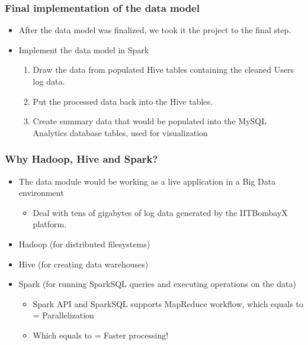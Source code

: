\documentclass[12pt,xcolor=dvipsnames]{beamer}
\begin{document}
\begin{frame}[t]
\frametitle{Final implementation of the data model}

\vfill
\begin{itemize}

\item After the data model was finalized, we took it the project to the final step.

\item Implement the data model in Spark

\begin{enumerate}

\item Draw the data from populated Hive tables containing the cleaned Users log data.

\item Put the processed data back into the Hive tables.

\item Create summary data that would be populated into the MySQL Analytics database tables, used for visualization

\end{enumerate}

\end{itemize}

\end{frame}



\begin{frame}[t]
\frametitle{Why Hadoop, Hive and Spark?}

\vfill
\begin{itemize}

\item The data module would be working as a live application in a Big Data environment

\begin{itemize}
\item Deal with tens of gigabytes of log data generated by the IITBombayX platform.
\end{itemize}

\item Hadoop (for distributed filesystems)

\item Hive (for creating data warehouses)

\item Spark (for running SparkSQL queries and executing operations on the data)

\begin{itemize}
\item Spark API and SparkSQL supports MapReduce workflow, which equals to = Parallelization
\item Which equals to = Faster processing!
\end{itemize}


\end{itemize}
\end{frame}
\end{document}
